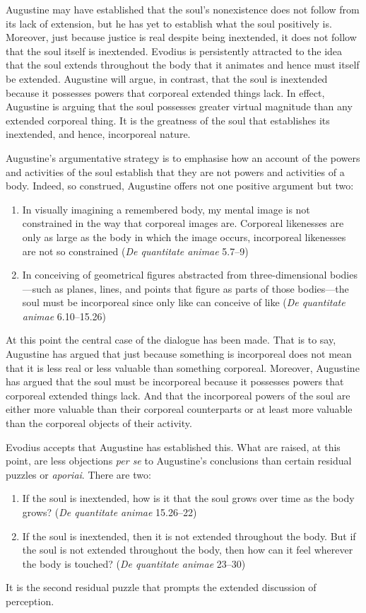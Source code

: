 \documentclass[12pt]{article}
\begin{document}
Augustine may have established that the soul’s nonexistence does not follow from its lack of extension, but he has yet to establish what the soul positively is. Moreover, just because justice is real despite being inextended, it does not follow that the soul itself is inextended. Evodius is persistently attracted to the idea that the soul extends throughout the body that it animates and hence must itself be extended. Augustine will argue, in contrast, that the soul is inextended because it possesses powers that corporeal extended things lack. In effect, Augustine is arguing that the soul possesses greater virtual magnitude than any extended corporeal thing. It is the greatness of the soul that establishes its inextended, and hence, incorporeal nature.

Augustine’s argumentative strategy is to emphasise how an account of the powers and activities of the soul establish that they are not powers and activities of a body. Indeed, so construed, Augustine offers not one positive argument but two:
\begin{enumerate}
	\item In visually imagining a remembered body, my mental image is not constrained in the way that corporeal images are. Corporeal likenesses are only as large as the body in which the image occurs, incorporeal likenesses are not so constrained (\emph{De quantitate animae} 5.7–9)
	\item In conceiving of geometrical figures abstracted from three-dimensional bodies—such as planes, lines, and points that figure as parts of those bodies—the soul must be incorporeal since only like can conceive of like (\emph{De quantitate animae} 6.10–15.26)
\end{enumerate}
At this point the central case of the dialogue has been made. That is to say, Augustine has argued that just because something is incorporeal does not mean that it is less real or less valuable than something corporeal. Moreover, Augustine has argued that the soul must be incorporeal because it possesses powers that corporeal extended things lack. And that the incorporeal powers of the soul are either more valuable than their corporeal counterparts or at least more valuable than the corporeal objects of their activity. 


Evodius accepts that Augustine has established this. What are raised, at this point, are less objections \emph{per se} to Augustine's conclusions than certain residual puzzles or \emph{aporiai}. There are two:
\begin{enumerate}
	\item If the soul is inextended, how is it that the soul grows over time as the body grows? (\emph{De quantitate animae} 15.26–22)
	\item If the soul is inextended, then it is not extended throughout the body. But if the soul is not extended throughout the body, then how can it feel wherever the body is touched? (\emph{De quantitate animae} 23–30)
\end{enumerate}
It is the second residual puzzle that prompts the extended discussion of perception.
	
\end{document}
